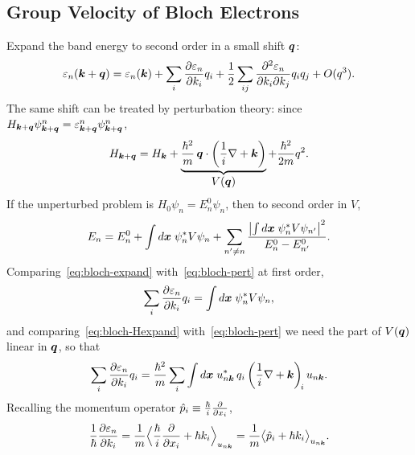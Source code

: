 \subsection{Group Velocity of Bloch Electrons}

Expand the band energy to second order in a small shift $\bm{q}$:
\begin{equation}
    \varepsilon_n(\bm{k}+\bm{q}) = \varepsilon_n(\bm{k}) + \sum_i \pdv{\varepsilon_n}{k_i} q_i
    + \frac{1}{2}\sum_{ij} \frac{\partial^2 \varepsilon_n}{\partial k_i \partial k_j} q_i q_j + O(q^3).
    \label{eq:bloch-expand}
\end{equation}
The same shift can be treated by perturbation theory: since $H_{\bm{k}+\bm{q}}\psi^n_{\bm{k}+\bm{q}} = \varepsilon^n_{\bm{k}+\bm{q}}\psi^n_{\bm{k}+\bm{q}}$,
\begin{equation}
    H_{\bm{k}+\bm{q}} = H_{\bm{k}} + \underbrace{\frac{\hbar^2}{m}\,\bm{q}\cdot\left(\frac{1}{i}\nabla + \bm{k}\right)}_{\displaystyle V(\bm{q})} + \frac{\hbar^2}{2m}q^2 .
    \label{eq:bloch-Hexpand}
\end{equation}
If the unperturbed problem is $H_0 \psi_n = E^0_n \psi_n$, then to second order in $V$,
\begin{equation}
    E_n = E^0_n + \int d\bm{x}\; \psi_n^* V \psi_n + \sum_{n' \neq n} \frac{\bigl| \int d\bm{x}\; \psi_n^* V \psi_{n'} \bigr|^2}{E^0_n - E^0_{n'}}.
    \label{eq:bloch-pert}
\end{equation}
Comparing~\eqref{eq:bloch-expand} with~\eqref{eq:bloch-pert} at first order,
\begin{equation}
    \sum_i \pdv{\varepsilon_n}{k_i} q_i = \int d\bm{x}\; \psi_n^* V \psi_n,
\end{equation}
and comparing~\eqref{eq:bloch-Hexpand} with~\eqref{eq:bloch-pert} we need the part of $V(\bm{q})$ linear in $\bm{q}$, so that
\begin{equation}
    \sum_i \pdv{\varepsilon_n}{k_i} q_i = \frac{\hbar^2}{m} \sum_i \int d\bm{x}\; u^*_{n\bm{k}}\, q_i \left(\frac{1}{i}\nabla + \bm{k}\right)_{\!i} u_{n\bm{k}}.
\end{equation}
Recalling the momentum operator $\hat{p}_i \equiv \frac{\hbar}{i}\pdv{}{x_i}$,
\begin{equation}
    \frac{1}{\hbar}\pdv{\varepsilon_n}{k_i} = \frac{1}{m} \Bigl\langle \frac{\hbar}{i}\pdv{}{x_i} + \hbar k_i \Bigr\rangle_{u_{n\bm{k}}}
    = \frac{1}{m}\bigl\langle \hat{p}_i + \hbar k_i \bigr\rangle_{u_{n\bm{k}}}.
\end{equation}
